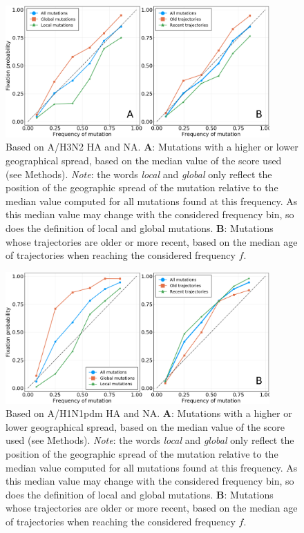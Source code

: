 \documentclass[reprint,amsmath,amssymb,superscriptaddress,showpacs,rmp]{revtex4-1}
\begin{document}
	\begin{figure}
		\centering
		\includegraphics[width=0.9\textwidth]{SM_figures/geospread_and_time_h3n2.png}
		\caption{Based on A/H3N2 HA and NA. \textbf{A}: Mutations with a higher or lower geographical spread, based on the median value of the score used (see Methods). \emph{Note}: the words \emph{local} and \emph{global} only reflect the position of the geographic spread of the mutation relative to the median value computed for all mutations found at this frequency. As this median value may change with the considered frequency bin, so does the definition of local and global mutations. \textbf{B}: Mutations whose trajectories are older or more recent, based on the median age of trajectories when reaching the considered frequency $f$.}
		\label{fig:geospread_and_time_h3n2}
	\end{figure}

	\begin{figure}
		\centering
		\includegraphics[width=0.9\textwidth]{SM_figures/geospread_and_time_h1n1pdm.png}
		\caption{Based on A/H1N1pdm HA and NA. \textbf{A}: Mutations with a higher or lower geographical spread, based on the median value of the score used (see Methods). \emph{Note}: the words \emph{local} and \emph{global} only reflect the position of the geographic spread of the mutation relative to the median value computed for all mutations found at this frequency. As this median value may change with the considered frequency bin, so does the definition of local and global mutations. \textbf{B}: Mutations whose trajectories are older or more recent, based on the median age of trajectories when reaching the considered frequency $f$.}
		\label{fig:geospread_and_time_h1n1pdm}
	\end{figure}
\end{document}
